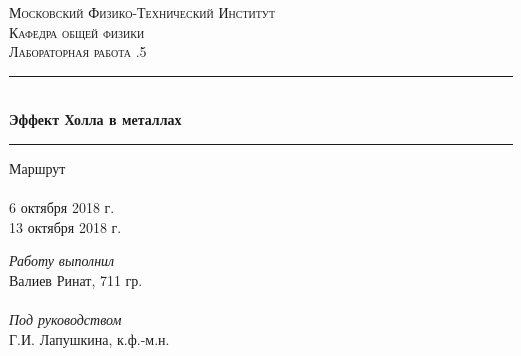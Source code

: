 \begin{titlepage}


\pagestyle{empty}	%

\begin{center}
	\textsc{\LARGE Московский Физико-Технический Институт}\\[1,5cm]
	\textsc{\Large Кафедра общей физики}\\[0,5cm]
	\textsc{\large Лабораторная работа .5}\\[2.5cm]

	\noindent\rule{\textwidth}{1pt}
	\\[0.5cm]
	{ \huge \bfseries Эффект Холла в металлах}
	\\[0.1cm]
	\noindent\rule{\textwidth}{1pt}
\end{center}

\vfill

\begin{minipage}[b]{0.3\textwidth}
	Маршрут \\\\
	6 октября 2018 г.\\
	13 октября 2018 г.
\end{minipage}
\hfill
\begin{minipage}[b]{0.33\textwidth}
	\textit{Работу выполнил}\\
	Валиев Ринат, 711 гр.\\\\
	\textit{Под руководством}\\
	Г.И. Лапушкина, к.ф.-м.н.
\end{minipage}


\end{titlepage}

\pagestyle{plain}		%
\setcounter{page}{2}	%